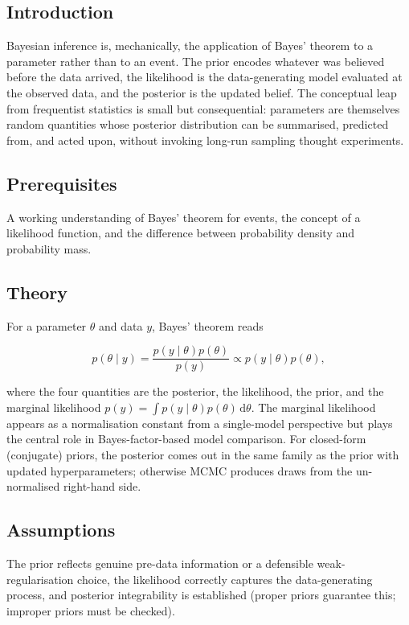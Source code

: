 \documentclass[
]{article}
\author{}
\date{\vspace{-2.5em}}
\begin{document}
\subsection{Introduction}\label{introduction}

Bayesian inference is, mechanically, the application of Bayes' theorem
to a parameter rather than to an event. The prior encodes whatever was
believed before the data arrived, the likelihood is the data-generating
model evaluated at the observed data, and the posterior is the updated
belief. The conceptual leap from frequentist statistics is small but
consequential: parameters are themselves random quantities whose
posterior distribution can be summarised, predicted from, and acted
upon, without invoking long-run sampling thought experiments.

\subsection{Prerequisites}\label{prerequisites}

A working understanding of Bayes' theorem for events, the concept of a
likelihood function, and the difference between probability density and
probability mass.

\subsection{Theory}\label{theory}

For a parameter \(\theta\) and data \(y\), Bayes' theorem reads

\[p(\theta \mid y) = \frac{p(y \mid \theta) p(\theta)}{p(y)} \propto p(y \mid \theta) p(\theta),\]

where the four quantities are the posterior, the likelihood, the prior,
and the marginal likelihood
\(p(y) = \int p(y \mid \theta) p(\theta) \, \mathrm d \theta\). The
marginal likelihood appears as a normalisation constant from a
single-model perspective but plays the central role in
Bayes-factor-based model comparison. For closed-form (conjugate) priors,
the posterior comes out in the same family as the prior with updated
hyperparameters; otherwise MCMC produces draws from the un-normalised
right-hand side.

\subsection{Assumptions}\label{assumptions}

The prior reflects genuine pre-data information or a defensible
weak-regularisation choice, the likelihood correctly captures the
data-generating process, and posterior integrability is established
(proper priors guarantee this; improper priors must be checked).
\end{document}
